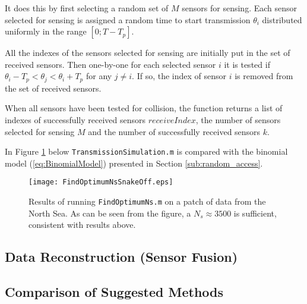 \documentclass[Main]{subfiles}
\begin{document}
		It does this by first selecting a random set of $M$ sensors for sensing.
		Each sensor selected for sensing is assigned a random time to start transmission $\theta_i$ distributed uniformly in the range $[0 ; T - T_p]$.

		All the indexes of the sensors selected for sensing are initially put in the set of received sensors.
		Then one-by-one for each selected sensor $i$ it is tested if 
		$\theta_i - T_p < \theta_j < \theta_i + T_p$
		for any
		$j \neq i$.
		If so, the index of sensor $i$ is removed from the set of received sensors.

		When all sensors have been tested for collision, the function returns a list of indexes of successfully received sensors $receiveIndex$, the number of sensors selected for sensing $M$ and the number of successfully received sensors $k$.

		In Figure \ref{fig:Mean_k_vs_p} below \texttt{TransmissionSimulation.m} is compared with the binomial model (\ref{eq:BinomialModel}) presented in Section \ref{sub:random_access}.

		\begin{figure}[H]
			\centering 
			\texttt{[image: FindOptimumNsSnakeOff.eps]}
			\caption{
				Results of running \texttt{FindOptimumNs.m} on a patch of data from the North Sea. As can be seen from the figure, a $N_s \approx 3500$ is sufficient, consistent with results above.}
			\label{fig:Mean_k_vs_p}
		\end{figure}

	

	\subsection{Data Reconstruction (Sensor Fusion)} %
	\label{sub:data_reconstruction}
	

	
	\subsection{Comparison of Suggested Methods} %
	\label{sub:comparison_of_suggested_methods}

	

\end{document}
